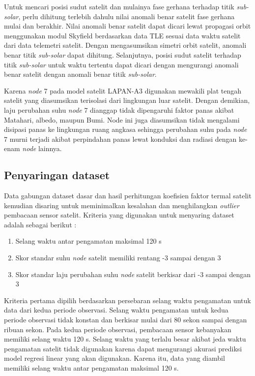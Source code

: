 Untuk mencari posisi sudut satelit dan mulainya fase gerhana terhadap titik \textit{sub-solar}, perlu dihitung terlebih dahulu nilai anomali benar satelit fase gerhana mulai dan berakhir. Nilai anomali benar satelit dapat dicari lewat propagasi orbit menggunakan modul Skyfield berdasarkan data TLE sesuai data waktu satelit dari data telemetri satelit. Dengan mengasumsikan simetri orbit satelit, anomali benar titik \textit{sub-solar} dapat dihitung. Selanjutnya, posisi sudut satelit terhadap titik \textit{sub-solar} untuk waktu tertentu dapat dicari dengan mengurangi anomali benar satelit dengan anomali benar titik \textit{sub-solar}.

Karena \textit{node} 7 pada model satelit LAPAN-A3 digunakan mewakili plat
tengah satelit yang diasumsikan terisolasi dari lingkungan luar satelit. Dengan
demikian, laju perubahan suhu \textit{node} 7 dianggap tidak dipengaruhi faktor
panas akibat Matahari, albedo, maupun Bumi. Node ini juga diasumsikan tidak
mengalami disipasi panas ke lingkungan ruang angkasa sehingga perubahan suhu
pada \textit{node} 7 murni terjadi akibat perpindahan panas lewat konduksi dan
radiasi dengan ke-enam \textit{node} lainnya.

\subsection{Penyaringan dataset}

Data gabungan dataset dasar dan hasil perhitungan koefisien faktor termal
satelit kemudian disaring untuk meminimalkan kesalahan dan menghilangkan
\textit{outlier} pembacaan sensor satelit. Kriteria yang digunakan untuk
menyaring dataset adalah sebagai berikut :

\begin{enumerate}
\item Selang waktu antar pengamatan maksimal 120 s 
\item Skor standar suhu \textit{node} satelit memiliki rentang -3 sampai dengan 3
\item Skor standar laju perubahan suhu \textit{node} satelit berkisar dari -3 sampai dengan 3 
\end{enumerate}

Kriteria pertama dipilih berdasarkan persebaran selang waktu pengamatan untuk
data dari kedua periode observasi. Selang waktu pengamatan untuk kedua periode
observasi tidak konstan dan berkisar mulai dari 80 sekon sampai dengan ribuan
sekon. Pada kedua periode observasi, pembacaan sensor kebanyakan memiliki
selang waktu 120 s. Selang waktu yang terlalu besar akibat jeda waktu
pengamatan satelit tidak digunakan karena dapat mengurangi akurasi prediksi
model regresi linear yang akan digunakan. Karena itu, data yang diambil
memiliki selang waktu antar pengamatan maksimal 120 s.

